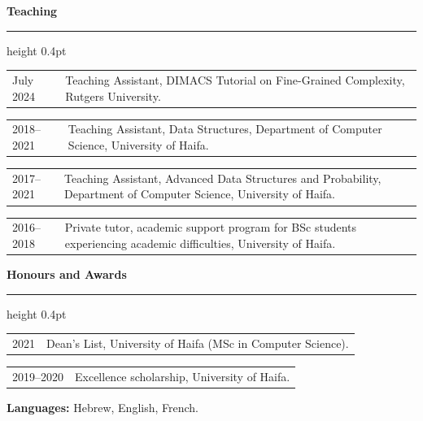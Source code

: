 \documentclass[11pt,a4paper]{article}
\makeatletter
\newcommand{\cvsection}[1]{%
  \par\addvspace{1.1\baselineskip}\Needspace{4\baselineskip}%
  {\large\bfseries #1\par}\nobreak\vspace{3pt}%
  {\color{gray}\hrule height 0.4pt}\nobreak\vspace{6pt}}
\newcommand{\datedentry}[2]{%
  \begin{tabularx}{\textwidth}{@{}p{2.7cm}@{\hspace{0.3cm}}>{\RaggedRight\arraybackslash}X@{}}
    #1 & #2
  \end{tabularx}\par\smallskip}
\makeatother
\begin{document}
\cvsection{Teaching}
\datedentry{July 2024}{Teaching Assistant, DIMACS Tutorial on Fine-Grained Complexity, Rutgers University.}
\datedentry{2018--2021}{Teaching Assistant, Data Structures, Department of Computer Science, University of Haifa.}
\datedentry{2017--2021}{Teaching Assistant, Advanced Data Structures and Probability, Department of Computer Science, University of Haifa.}
\datedentry{2016--2018}{%
  Private tutor, academic support program for BSc students experiencing academic
  difficulties, University of Haifa.}

\cvsection{Honours and Awards}
\datedentry{2021}{Dean's List, University of Haifa (MSc in Computer Science).}
\datedentry{2019--2020}{Excellence scholarship, University of Haifa.}

\smallskip
{\small\textbf{Languages:} Hebrew, English, French.\par}
\end{document}
